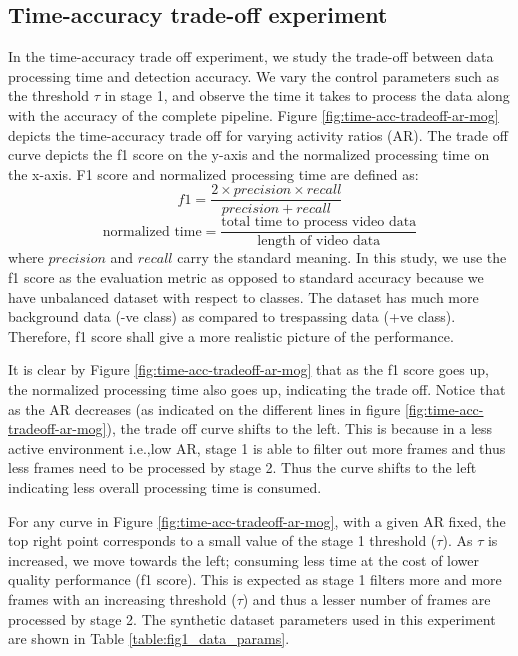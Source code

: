 \subsection{Time-accuracy trade-off experiment}
\label{sec:time-accuracy-trafe-off}
In the time-accuracy trade off experiment, we study the trade-off  between data processing time and detection accuracy.
We vary the control parameters such as the threshold $\tau$ in stage 1, and observe the time it takes to process the data along with the accuracy of the complete pipeline. Figure \ref{fig:time-acc-tradeoff-ar-mog} depicts the time-accuracy trade off for varying activity ratios (AR). The trade off curve depicts the f1 score on the y-axis and the normalized processing time on the x-axis. F1 score and normalized processing time are defined as: 
$$ f1 = \frac{2 \times precision \times recall}{precision + recall}$$
$$\text{normalized time} = \frac{\text{total time to process video data}}{\text{length of video data}}$$
where $precision$ and $recall$ carry the standard meaning. In this study, we use the f1 score as the evaluation metric as opposed to standard accuracy because we have unbalanced dataset with respect to classes. The dataset has much more background data (-ve class) as compared to trespassing data (+ve class). Therefore, f1 score shall give a more realistic picture of the performance. 

It is clear by Figure \ref{fig:time-acc-tradeoff-ar-mog} that as the f1 score goes up, the normalized processing time also goes up, indicating the trade off. Notice that as the AR decreases (as indicated on the different lines in figure \ref{fig:time-acc-tradeoff-ar-mog}), the trade off curve shifts to the left. This is because in a less active environment i.e.,low AR, stage 1 is able to filter out more frames and thus less frames need to be processed by stage 2. Thus the curve shifts to the left indicating less overall processing time is consumed.   

For any curve in Figure \ref{fig:time-acc-tradeoff-ar-mog}, with a given AR fixed, the top right point corresponds to a small value of the stage 1 threshold ($\tau$). As $\tau$ is increased, we move towards the left; consuming less time at the cost of lower quality performance (f1 score). This is expected as stage 1 filters more and more frames with an increasing threshold ($\tau$) and thus a lesser number of frames are processed by stage 2. The synthetic dataset parameters used in this experiment are shown in Table \ref{table:fig1_data_params}. 

